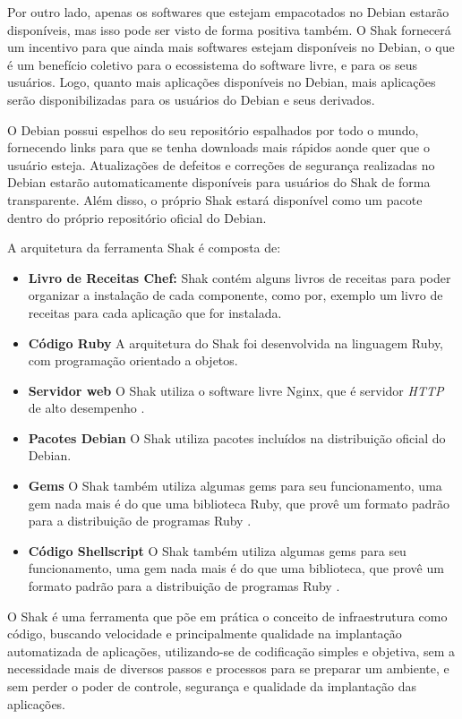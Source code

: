 Por outro lado, apenas os softwares que estejam empacotados no Debian estarão
disponíveis, mas isso pode ser visto de forma positiva também. O Shak
fornecerá um incentivo para que ainda mais softwares estejam disponíveis no
Debian, o que é um benefício coletivo para o ecossistema do software livre, e
para os seus usuários. Logo, quanto mais aplicações disponíveis no Debian,
mais aplicações serão disponibilizadas para os usuários do Debian e seus derivados.

O Debian possui espelhos do seu repositório espalhados por todo o mundo,
fornecendo links para que se tenha downloads mais rápidos aonde quer que o usuário esteja.
Atualizações de defeitos e correções de segurança realizadas no Debian estarão
automaticamente disponíveis para usuários do Shak de forma transparente. Além disso,
o próprio Shak estará disponível como um pacote dentro do próprio repositório oficial do Debian.

A arquitetura da ferramenta Shak é composta de:

\begin{itemize}
  \item  \textbf{Livro de Receitas Chef:} Shak contém alguns livros de receitas
  para poder organizar a instalação de cada componente, como por, exemplo um livro
  de receitas para cada aplicação que for instalada.
  \item  \textbf{Código Ruby} A arquitetura do Shak foi desenvolvida na linguagem
  Ruby, com programação orientado a objetos.
  \item  \textbf{Servidor web} O Shak utiliza o software livre Nginx, que é
  servidor \textit{HTTP} de alto desempenho \cite{nginx}.
  \item  \textbf{Pacotes Debian} O Shak utiliza pacotes incluídos na distribuição
  oficial do Debian.
  \item  \textbf{Gems} O Shak também utiliza algumas gems para seu funcionamento,
  uma gem nada mais é do que uma biblioteca Ruby, que provê um formato padrão para
  a distribuição de programas Ruby \cite{gem}.
  \item  \textbf{Código Shellscript} O Shak também utiliza algumas gems para seu funcionamento,
  uma gem nada mais é do que uma biblioteca, que provê um formato padrão para
  a distribuição de programas Ruby \cite{gem}.
\end{itemize}

O Shak é uma ferramenta que põe em prática o conceito de infraestrutura
como código, buscando velocidade e principalmente qualidade na implantação
automatizada de aplicações, utilizando-se de codificação simples e objetiva,
sem a necessidade mais de diversos passos e processos para se preparar um ambiente,
e sem perder o poder de controle, segurança e qualidade da implantação das aplicações.

